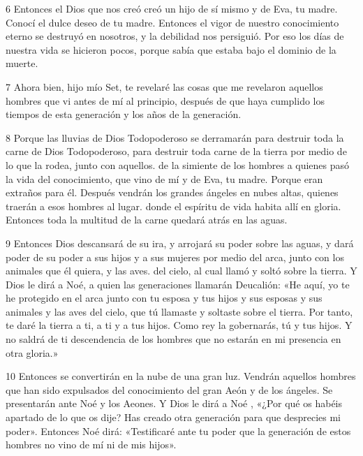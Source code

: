 \par 6 Entonces el Dios que nos creó creó un hijo de sí mismo y de Eva, tu madre. Conocí el dulce deseo de tu madre. Entonces el vigor de nuestro conocimiento eterno se destruyó en nosotros, y la debilidad nos persiguió. Por eso los días de nuestra vida se hicieron pocos, porque sabía que estaba bajo el dominio de la muerte.

\par 7 Ahora bien, hijo mío Set, te revelaré las cosas que me revelaron aquellos hombres que vi antes de mí al principio, después de que haya cumplido los tiempos de esta generación y los años de la generación.

\par 8 Porque las lluvias de Dios Todopoderoso se derramarán para destruir toda la carne de Dios Todopoderoso, para destruir toda carne de la tierra por medio de lo que la rodea, junto con aquellos. de la simiente de los hombres a quienes pasó la vida del conocimiento, que vino de mí y de Eva, tu madre. Porque eran extraños para él. Después vendrán los grandes ángeles en nubes altas, quienes traerán a esos hombres al lugar. donde el espíritu de vida habita allí en gloria. Entonces toda la multitud de la carne quedará atrás en las aguas.

\par 9 Entonces Dios descansará de su ira, y arrojará su poder sobre las aguas, y dará poder de su poder a sus hijos y a sus mujeres por medio del arca, junto con los animales que él quiera, y las aves. del cielo, al cual llamó y soltó sobre la tierra. Y Dios le dirá a Noé, a quien las generaciones llamarán Deucalión: «He aquí, yo te he protegido en el arca junto con tu esposa y tus hijos y sus esposas y sus animales y las aves del cielo, que tú llamaste y soltaste sobre el tierra. Por tanto, te daré la tierra a ti, a ti y a tus hijos. Como rey la gobernarás, tú y tus hijos. Y no saldrá de ti descendencia de los hombres que no estarán en mi presencia en otra gloria.»

\par 10 Entonces se convertirán en la nube de una gran luz. Vendrán aquellos hombres que han sido expulsados ​​del conocimiento del gran Aeón y de los ángeles. Se presentarán ante Noé y los Aeones. Y Dios le dirá a Noé , «¿Por qué os habéis apartado de lo que os dije? Has creado otra generación para que desprecies mi poder». Entonces Noé dirá: «Testificaré ante tu poder que la generación de estos hombres no vino de mí ni de mis hijos».

